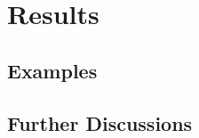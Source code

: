 \chapter{Results} \label{cpt:Results}

\section{Examples} \label{sec:Examples}

\section{Further Discussions} \label{sec:Discussions}

